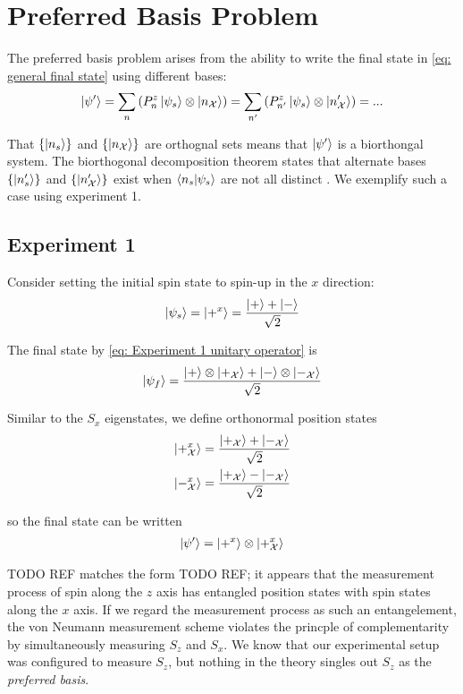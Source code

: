 \section{Preferred Basis Problem}

The preferred basis problem arises from the ability to write the final state in \autoref{eq: general final state} using different bases:
\begin{align}
  \ket{\psi'} = \sum_{n}\left(P^z_n\ket{\psi_s} \otimes \ket{n_\mathcal{X}}\right) = \sum_{n'}\left(P^z_{n'}\ket{\psi_s} \otimes \ket{n'_\mathcal{X}}\right) =...
\end{align}

That $\{ \ket{n_s} \}$ and $\{ \ket{n_\mathcal{X}} \}$ are orthognal sets means that $\ket{\psi'}$ is a biorthongal system. The biorthogonal decomposition theorem states that alternate bases $\{ \ket{n'_s} \}$ and $\{ \ket{n'_\mathcal{X}} \}$ exist when $\braket{n_s | \psi_s}$ are not all distinct \cite{Elby}. We exemplify such a case using experiment 1.

\subsection{Experiment 1}

Consider setting the initial spin state to spin-up in the $x$ direction:
\begin{align}
  \ket{\psi_s} = \ket{+^x} = \frac{\ket{+} + \ket{-}}{\sqrt{2}}
\end{align}

The final state by \autoref{eq: Experiment 1 unitary operator} is
\begin{align}
  \ket{\psi_f} = \frac{\ket{+}\otimes\ket{+_\mathcal{X}} + \ket{-}\otimes\ket{-_\mathcal{X}}}{\sqrt{2}}
\end{align}

Similar to the $S_x$ eigenstates, we define orthonormal position states
\begin{align}
  \ket{+^x_\mathcal{X}} = \frac{\ket{+_\mathcal{X}} + \ket{-_\mathcal{X}}}{\sqrt{2}} \\ \nonumber
  \ket{-^x_\mathcal{X}} = \frac{\ket{+_\mathcal{X}} - \ket{-_\mathcal{X}}}{\sqrt{2}}
\end{align}

so the final state can be written
\begin{align}
  \ket{\psi'} = \ket{+^x} \otimes \ket{+^x_\mathcal{X}}
\end{align}

TODO REF matches the form TODO REF; it appears that the measurement process of spin along the $z$ axis has entangled position states with spin states along the $x$ axis. If we regard the measurement process as such an entangelement, the von Neumann measurement scheme violates the princple of complementarity by simultaneously measuring $S_z$ and $S_x$. We know that our experimental setup was configured to measure $S_z$, but nothing in the theory singles out $S_z$ as the \textit{preferred basis}.

